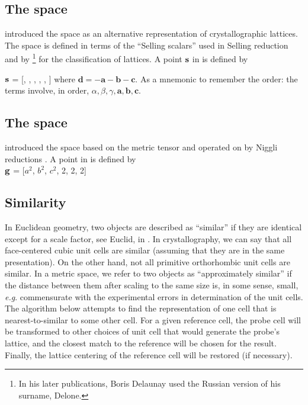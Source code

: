\documentclass[preprint]{iucr}              %
\numberwithin{equation}{section}
\numberwithin{equation}{section}
\begin{document}
	\subsection{The space \SVI{}}
	 introduced the space \SVI{} as an alternative
	representation of crystallographic lattices. The space is defined in terms of the
	``Selling scalars'' used in Selling reduction \cite{Selling1874} and by %
		\footnote{In his later publications, Boris Delaunay used the Russian version of his surname, Delone.}
	for the classification of lattices. A point $\bf{s}$ in \SVI{} is defined by 
	
	$\bf{s}$  = [, , , , , ]
	where
	${\mathbf d} = -{\mathbf a} - {\mathbf b} - {\mathbf c}$.
	As a mnemonic to remember the order: the terms involve, in order, $ \alpha, \beta,
	\gamma, \mathbf{a}, \mathbf{b}, \mathbf{c}$.
	
	\subsection{The space \GVI{}}
	 introduced the space \GVI{} based on the metric tensor
	and operated on by Niggli reductions \cite{Niggli1928}. A point in \GVI{}
	is defined by \\
	$\bf{g}$ =   [$\mathit{a^2}$, $\mathit{b^2}$, $\mathit{c^2}$, 2, 2, 2]
	
	\subsection{Similarity}
	
In Euclidean geometry, two objects are described as ``similar'' if they are identical except for a scale factor, see Euclid, in \cite{heath1956thirteen}.
	In crystallography, we can say that all face-centered cubic unit cells are similar (assuming
	that they are in the same presentation). On the other hand, not all primitive orthorhombic 
	unit cells are similar.  In a metric space, we
	refer to two objects as ``approximately similar'' if the distance between them after scaling
	to the same size is, in some sense, small, {\it e.g}. commensurate with the experimental errors
	in determination of the unit cells.  The algorithm below attempts to find the representation of one 
	cell that is nearest-to-similar to some other cell. For a given reference cell, the probe cell
	will be transformed to other choices of unit cell that would generate the probe's lattice, and the
	closest match to the reference will be chosen for the result. Finally, the lattice centering
	of the reference cell will be restored (if necessary).
	
\end{document}
